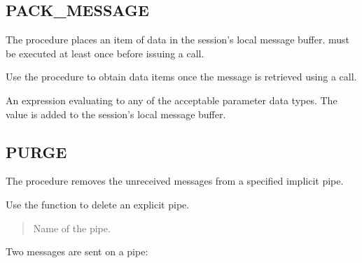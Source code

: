 \documentclass[letterpaper,10pt,english,openany,oneside]{sphinxmanual}
\begin{document}
\newpage


\subsection{PACK\_MESSAGE}
\label{\detokenize{pack_message::doc}}\label{\detokenize{pack_message:pack-message}}
The  procedure places an item of data in the session’s
local message buffer.  must be executed at least once
before issuing a  call.
\begin{quote}

\end{quote}

Use the  procedure to obtain data items once the message
is retrieved using a  call.



An expression evaluating to any of the acceptable parameter data types.
The value is added to the session’s local message buffer.

\newpage


\subsection{PURGE}
\label{\detokenize{purge::doc}}\label{\detokenize{purge:purge}}
The  procedure removes the unreceived messages from a specified
implicit pipe.


Use the  function to delete an explicit pipe.


\begin{quote}

Name of the pipe.
\end{quote}


Two messages are sent on a pipe:
\end{document}
